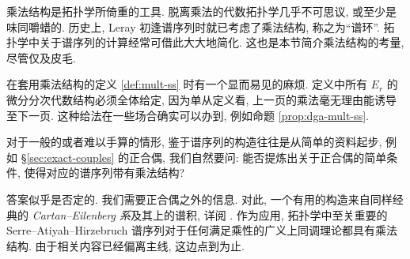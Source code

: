 \begin{remark}
	乘法结构是拓扑学所倚重的工具. 脱离乘法的代数拓扑学几乎不可思议, 或至少是味同嚼蜡的. 历史上, Leray 初逢谱序列时就已考虑了乘法结构, 称之为``谱环''. 拓扑学中关于谱序列的计算经常可借此大大地简化. 这也是本节简介乘法结构的考量, 尽管仅及皮毛.
	
	在套用乘法结构的定义 \ref{def:mult-ss} 时有一个显而易见的麻烦. 定义中所有 $E_r$ 的微分分次代数结构必须全体给定, 因为单从定义看, 上一页的乘法毫无理由能诱导至下一页. 这种给法在一些场合确实可以办到, 例如命题 \ref{prop:dga-mult-ss}.
	
	对于一般的或者难以手算的情形, 鉴于谱序列的构造往往是从简单的资料起步, 例如 \S\ref{sec:exact-couples} 的正合偶, 我们自然要问: 能否提炼出关于正合偶的简单条件, 使得对应的谱序列带有乘法结构?
	
	答案似乎是否定的. 我们需要正合偶之外的信息. 对此, 一个有用的构造来自同样经典的 \emph{Cartan--Eilenberg 系}及其上的谱积, 详阅 \cite[II.A]{Dou58}. 作为应用, 拓扑学中至关重要的 Serre--Atiyah--Hirzebruch 谱序列对于任何满足乘性的广义上同调理论都具有乘法结构. 由于相关内容已经偏离主线, 这边点到为止.
\end{remark}


